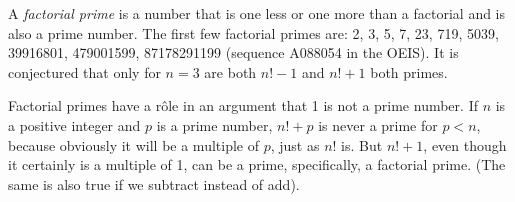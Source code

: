 \documentclass[12pt]{article}
\begin{document}
A {\em factorial prime} is a number that is one less or one more than a factorial and is also a prime number. The first few factorial primes are: 2, 3, 5, 7, 23, 719, 5039, 39916801, 479001599, 87178291199 (sequence A088054 in the OEIS). It is conjectured that only for $n = 3$ are both $n! - 1$ and $n! + 1$ both primes.

Factorial primes have a r\^ole in an argument that 1 is not a prime number. If $n$ is a positive integer and $p$ is a prime number, $n! + p$ is never a prime for $p < n$, because obviously it will be a multiple of $p$, just as $n!$ is. But $n! + 1$, even though it certainly is a multiple of 1, can be a prime, specifically, a factorial prime. (The same is also true if we subtract instead of add).
\end{document}
